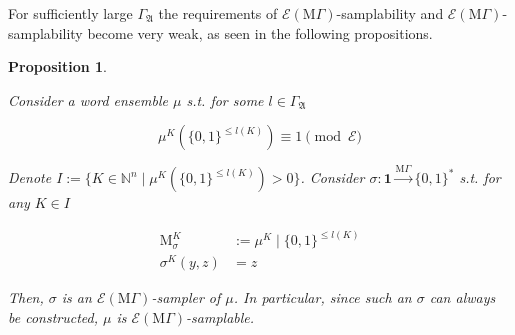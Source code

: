 \documentclass{article}
\numberwithin{equation}{section}
\theoremstyle{definition}
\theoremstyle{plain}
\newtheorem{proposition}{Proposition}[section]
\newcommand{\Bool}{\{0,1\}}
\newcommand{\Words}{{\Bool^*}}
\DeclareMathOperator{\M}{M}
\newcommand{\Nats}{\mathbb{N}}
\newcommand{\GrowA}{\Gamma_{\mathfrak{A}}}
\newcommand{\MGrow}{\mathrm{M}\Gamma}
\newcommand{\Fall}{\mathcal{E}}
\newcommand{\EMG}{\Fall(\MGrow)}
\newcommand{\MScheme}{\xrightarrow{\MGrow}}
\begin{document}
For sufficiently large $\GrowA$ the requirements of $\EMG$-samplability and $\EMG$-samplability become very weak, as seen in the following propositions.

\begin{samepage}
\begin{proposition}
\label{prp:adv_mgamma_smp}

Consider a word ensemble $\mu$ s.t. for some $l \in \GrowA$

\begin{equation}
\label{eqn:prp__adv_mgamma_smp}
\mu^{K}(\Bool^{\leq l(K)}) \equiv 1 \pmod \Fall
\end{equation}

Denote ${I:=\{K \in \Nats^n \mid \mu^{K}(\Bool^{\leq l(K)}) > 0\}}$. Consider ${\sigma: \bm{1} \MScheme \Words}$ s.t. for any ${K \in I}$

\begin{align*}
\M_\sigma^K&:=\mu^{K} \mid \Bool^{\leq l(K)} \\
\sigma^K(y,z)&=z
\end{align*}

Then, $\sigma$ is an $\EMG$-sampler of $\mu$. In particular, since such an $\sigma$ can always be constructed, $\mu$ is $\EMG$-samplable.

\end{proposition}
\end{samepage}
\end{document}
